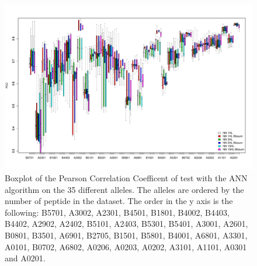 \begin{figure}[ht]
\begin{center}
\includegraphics[width=18cm]{fig/annBX1.pdf}
\caption{Boxplot of the Pearson Correlation Coefficent of test with the ANN algorithm on the 35 different alleles. The alleles are ordered by the number of peptide in the dataset. The order in the y axis is the following:
B5701, A3002, A2301, B4501, B1801, B4002, B4403, B4402, A2902, A2402, B5101, A2403, B5301, B5401, A3001, A2601, B0801, B3501, A6901, B2705, B1501, B5801, B4001, A6801, A3301, A0101, B0702, A6802, A0206, A0203, A0202, A3101, A1101, A0301 and A0201.}\label{fig:ann2}
\end{center}
\end{figure}

